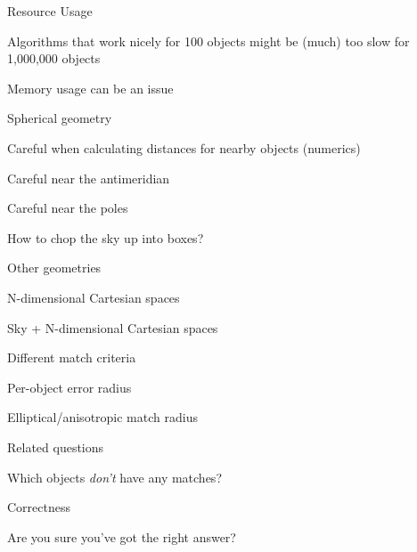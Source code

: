 \documentclass[20pt,landscape]{foils}
\begin{document}

\begin{list1}
\vspace*{-0.2cm}
  \item Resource Usage
\vspace*{-0.2cm}
  \begin{list2}
    \item Algorithms that work nicely for 100 objects might be
          (much) too slow for 1,000,000 objects
\vspace*{-0.1cm}
    \item Memory usage can be an issue
  \end{list2}
\vspace*{-0.2cm}
  \item Spherical geometry
\vspace*{-0.2cm}
  \begin{list2}
    \item Careful when calculating distances for nearby objects (numerics)
\vspace*{-0.1cm}
    \item Careful near the antimeridian
\vspace*{-0.1cm}
    \item Careful near the poles
\vspace*{-0.1cm}
    \item How to chop the sky up into boxes?
  \end{list2}
\vspace*{-0.2cm}
  \item Other geometries
\vspace*{-0.2cm}
  \begin{list2}
    \item N-dimensional Cartesian spaces
\vspace*{-0.1cm}
    \item Sky + N-dimensional Cartesian spaces
  \end{list2}
\vspace*{-0.2cm}
  \item Different match criteria
\vspace*{-0.2cm}
  \begin{list2}
    \item Per-object error radius
\vspace*{-0.1cm}
    \item Elliptical/anisotropic match radius
  \end{list2}
\vspace*{-0.2cm}
  \item Related questions
\vspace*{-0.2cm}
  \begin{list2}
    \item Which objects {\sl don't\/} have any matches?
  \end{list2}
\vspace*{-0.2cm}
  \item Correctness
\vspace*{-0.2cm}
  \begin{list2}
    \item Are you sure you've got the right answer?
  \end{list2}
\end{list1}
\end{document}
